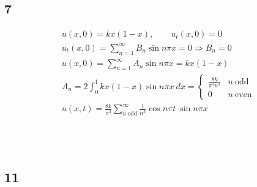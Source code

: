 \newpage


\subsection*{7}


\begin{gather*}
	u(x, 0) = k x (1 - x),
	\qquad
	u_t(x, 0) = 0
	\\
	u_t(x, 0) = \sum_{n = 1}^\infty{B_n\sin{n \pi x}} =	0
	\Rightarrow
	B_n = 0
	\\
	u(x, 0) = \sum_{n = 1}^\infty{A_n\sin{n \pi x}} = k x (1 - x)
	\\
	A_n = 2 \int_0^1{k x (1 - x) \sin{n \pi x}\ dx} = \left\{
		\begin{matrix*}
			\frac{8 k}{\pi^3 n^3}	& n\ \text{odd} \\
			0						& n\ \text{even}
		\end{matrix*}
	\right.
	\\
	u(x, t) = \frac{8 k}{\pi^3} \sum_{n\ \text{odd}}^\infty{\frac{1}{n^3} \cos{n \pi t}\ \sin{n \pi x}}
\end{gather*}

\bigskip

\bigskip
\\
\bigskip
\\

\newpage

\subsection*{11}


